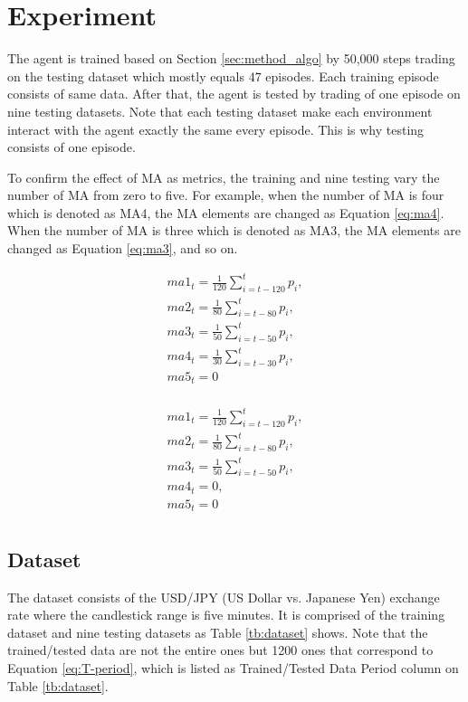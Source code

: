 \chapter{Experiment}
\label{sec:experiment}
The agent is trained based on Section \ref{sec:method_algo} by 50,000 steps trading on the testing dataset which mostly equals 47 episodes. Each training episode consists of same data. After that, the agent is tested by trading of one episode on nine testing datasets. Note that each testing dataset make each environment interact with the agent exactly the same every episode. This is why testing consists of one episode.

To confirm the effect of MA as metrics, the training and nine testing vary the number of MA from zero to five. For example, when the number of MA is four which is denoted as MA4, the MA elements are changed as Equation \ref{eq:ma4}. When the number of MA is three which is denoted as MA3, the MA elements are changed as Equation \ref{eq:ma3}, and so on. 

\begin{equation}
  \label{eq:ma4}
  \begin{array}{l}
    ma1_{t} = \frac{1}{120} \displaystyle \sum_{i=t-120}^{t} p_i, \\
    ma2_{t} = \frac{1}{80} \displaystyle \sum_{i=t-80}^{t} p_i,   \\
    ma3_{t} = \frac{1}{50} \displaystyle \sum_{i=t-50}^{t} p_i,   \\
    ma4_{t} = \frac{1}{30} \displaystyle \sum_{i=t-30}^{t} p_i,   \\
    ma5_{t} = 0   \\
  \end{array}
\end{equation}

\begin{equation}
  \label{eq:ma3}
  \begin{array}{l}
    ma1_{t} = \frac{1}{120} \displaystyle \sum_{i=t-120}^{t} p_i, \\
    ma2_{t} = \frac{1}{80} \displaystyle \sum_{i=t-80}^{t} p_i,   \\
    ma3_{t} = \frac{1}{50} \displaystyle \sum_{i=t-50}^{t} p_i,   \\
    ma4_{t} = 0,   \\
    ma5_{t} = 0   \\
  \end{array}
\end{equation}

\section{Dataset}
\label{sec:dataset}
The dataset consists of the USD/JPY (US Dollar vs. Japanese Yen) exchange rate where the candlestick range is five minutes. It is comprised of the training dataset and nine testing datasets as Table \ref{tb:dataset} shows. Note that the trained/tested data are not the entire ones but 1200 ones that correspond to Equation \ref{eq:T-period}, which is listed as Trained/Tested Data Period column on Table \ref{tb:dataset}.


